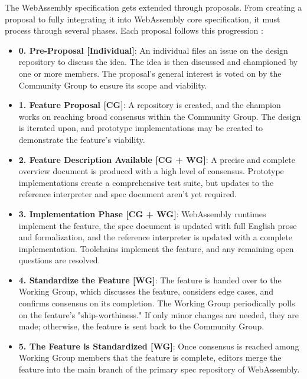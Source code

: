 The WebAssembly specification gets extended through proposals. From creating a proposal to fully integrating it into WebAssembly core specification, it must process through several phases. Each proposal follows this progression \cite{webassemblyw3c_2023_webassembly}:
\begin{itemize}
  \item \textbf{0. Pre-Proposal [Individual]}: An individual files an issue on the design repository to discuss the idea. The idea is then discussed and championed by one or more members. 
  The proposal's general interest is voted on by the Community Group to ensure its scope and viability.
  \item \textbf{1. Feature Proposal [CG]}: A repository is created, and the champion works on reaching broad consensus within the Community Group. The design is iterated upon, and prototype implementations may be created to demonstrate the feature's viability.
  \item \textbf{2. Feature Description Available [CG + WG]}: A precise and complete overview document is produced with a high level of consensus. Prototype implementations create a comprehensive 
  test suite, but updates to the reference interpreter and spec document aren't yet required.
  \item \textbf{3. Implementation Phase [CG + WG]}: WebAssembly runtimes implement the feature, the spec document is updated with full English prose and formalization, and the reference interpreter is updated with a complete implementation. Toolchains implement the feature, and any remaining open questions are resolved.
  \item \textbf{4. Standardize the Feature [WG]}: The feature is handed over to the Working Group, which discusses the feature, considers edge cases, and confirms consensus on its completion. 
  The Working Group periodically polls on the feature's "ship-worthiness." If only minor changes are needed, they are made; otherwise, the feature is sent back to the Community Group.
  \item \textbf{5. The Feature is Standardized [WG]}: Once consensus is reached among Working Group members that the feature is complete, editors merge the feature into the main branch of the primary spec repository of WebAssembly.
\end{itemize}

